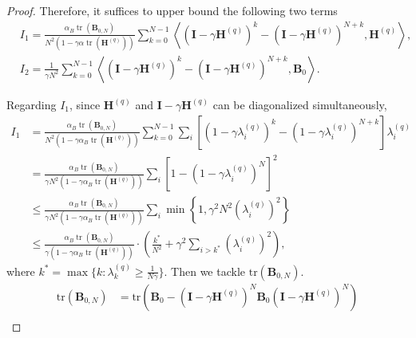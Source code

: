 \documentclass[11pt, letterpaper]{article}
\begin{document}
\begin{proof}
    Therefore, it suffices to upper bound the following two terms
    \begin{equation*}
        \begin{aligned}
            & I_{1}=\frac{\alpha_B\operatorname{tr}(\mathbf{B}_{0,N})}{N^2(1-\gamma\alpha\operatorname{tr}(\mathbf{H}^{(q)}))}\sum_{k=0}^{N-1}\left\langle(\mathbf{I}-\gamma\mathbf{H}^{(q)})^k-(\mathbf{I}-\gamma\mathbf{H}^{(q)})^{N+k},\mathbf{H}^{(q)}\right\rangle, \\
            & I_{2}=\frac{1}{\gamma N^2}\sum_{k=0}^{N-1}\left\langle(\mathbf{I}-\gamma\mathbf{H}^{(q)})^k-(\mathbf{I}-\gamma\mathbf{H}^{(q)})^{N+k},\mathbf{B}_0\right\rangle.
        \end{aligned}
    \end{equation*}

    Regarding $I_1$, since $\mathbf{H}^{(q)}$ and $\mathbf{I}-\gamma\mathbf{H}^{(q)}$ can be diagonalized simultaneously, 
    \begin{equation*}
        \begin{aligned}
            I_{1}& =\frac{\alpha_B\operatorname{tr}(\mathbf{B}_{0,N})}{N^2(1-\gamma\alpha_B\operatorname{tr}(\mathbf{H}^{(q)}))}\sum_{k=0}^{N-1}\sum_i\left[(1-\gamma\lambda_i^{(q)})^k-(1-\gamma\lambda_i^{(q)})^{N+k}\right]\lambda_i^{(q)}\\
            & =\frac{\alpha_B\operatorname{tr}(\mathbf{B}_{0,N})}{\gamma N^2(1-\gamma\alpha_B\operatorname{tr}(\mathbf{H}^{(q)}))}\sum_i\left[1-(1-\gamma\lambda_i^{(q)})^N\right]^2 \\
            & \leq\frac{\alpha_B\operatorname{tr}(\mathbf{B}_{0,N})}{\gamma N^2(1-\gamma\alpha_B\operatorname{tr}(\mathbf{H}^{(q)}))}\sum_i\min\left\{1,\gamma^2N^2(\lambda_i^{(q)})^2\right\}\\
            &\leq\frac{\alpha_B\operatorname{tr}(\mathbf{B}_{0,N})}{\gamma(1-\gamma\alpha_B\operatorname{tr}(\mathbf{H}^{(q)}))}\cdot\left(\frac{k^*}{N^2}+\gamma^2\sum_{i>k^*}(\lambda_i^{(q)})^2\right),
        \end{aligned}
    \end{equation*}
    where $k^*=\max\{k:\lambda_k^{(q)}\geq\frac{1}{N\gamma}\}$. Then we tackle $\mathrm{tr}(\mathbf{B}_{0,N})$.
    \begin{equation}
    \label{trB0N}
        \begin{aligned}
            \mathrm{tr}(\mathbf{B}_{0,N})&=\mathrm{tr}\left(\mathbf{B}_{0}-(\mathbf{I}-\gamma\mathbf{H}^{(q)})^{N}\mathbf{B}_{0}(\mathbf{I}-\gamma\mathbf{H}^{(q)})^{N}\right)\\

\end{aligned}
\end{equation}
\end{proof}
\end{document}
